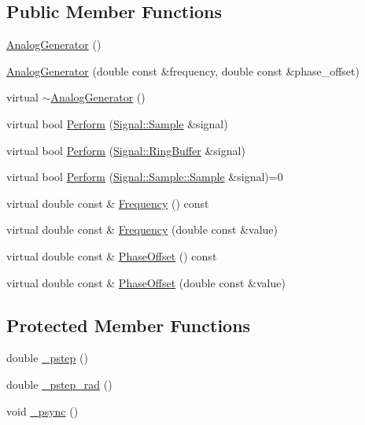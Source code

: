 \subsection*{Public Member Functions}
\begin{DoxyCompactItemize}
\item 
\hyperlink{classDSG_1_1Analog_1_1AnalogGenerator_a9f8a1dda1a87f9591f1d546bf671f787}{Analog\-Generator} ()
\item 
\hyperlink{classDSG_1_1Analog_1_1AnalogGenerator_a96e11cd1c698f3c3de23535a3f06f9e8}{Analog\-Generator} (double const \&frequency, double const \&phase\-\_\-offset)
\item 
virtual \hyperlink{classDSG_1_1Analog_1_1AnalogGenerator_aea583e0a6bc6ddae7c453fe9dda47f77}{$\sim$\-Analog\-Generator} ()
\item 
virtual bool \hyperlink{classDSG_1_1Analog_1_1AnalogGenerator_a96a6dc9af99bcd8a38a18891f5f88035}{Perform} (\hyperlink{classDSG_1_1Signal_1_1Sample}{Signal\-::\-Sample} \&signal)
\item 
virtual bool \hyperlink{classDSG_1_1Analog_1_1AnalogGenerator_a77f6225ff228c4fd943016bcea29f73d}{Perform} (\hyperlink{classDSG_1_1Signal_1_1RingBuffer}{Signal\-::\-Ring\-Buffer} \&signal)
\item 
virtual bool \hyperlink{classDSG_1_1SignalProcess_ae8a803d175eca1ec5f34a52035a082b4}{Perform} (\hyperlink{classDSG_1_1Signal_1_1Sample_a21db6fade3ee3554ed3887cb2b74daff}{Signal\-::\-Sample\-::\-Sample} \&signal)=0
\item 
virtual double const \& \hyperlink{classDSG_1_1SignalGenerator_aedac746c5a70818d120858542ecb7c45}{Frequency} () const 
\item 
virtual double const \& \hyperlink{classDSG_1_1SignalGenerator_ae3ce8d45bafabbd86a0f535b15c3cd46}{Frequency} (double const \&value)
\item 
virtual double const \& \hyperlink{classDSG_1_1SignalGenerator_a1ce521847edd0b837fd840998f906b4b}{Phase\-Offset} () const 
\item 
virtual double const \& \hyperlink{classDSG_1_1SignalGenerator_a08b71b1f30ba65e629642c570291dc0e}{Phase\-Offset} (double const \&value)
\end{DoxyCompactItemize}
\subsection*{Protected Member Functions}
\begin{DoxyCompactItemize}
\item 
double \hyperlink{classDSG_1_1SignalGenerator_ac0d781b8673b3a283bf7c133290ede50}{\-\_\-pstep} ()
\item 
double \hyperlink{classDSG_1_1SignalGenerator_ae660eb4caa88b8d278f8d24d0908a487}{\-\_\-pstep\-\_\-rad} ()
\item 
void \hyperlink{classDSG_1_1SignalGenerator_a05baccb38d1e52860d4fcf7cb8430efc}{\-\_\-psync} ()
\end{DoxyCompactItemize}
